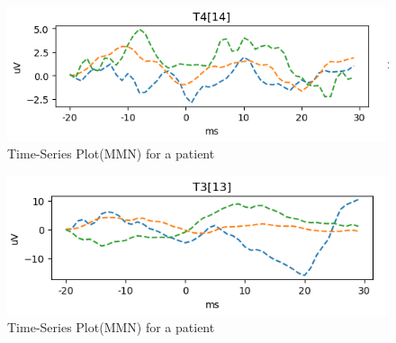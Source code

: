 \documentclass[10pt]{article}
\begin{document}
\begin{figure}
  \includegraphics{simiat_temporal.png}
  \caption{Time-Series Plot(MMN) for a patient} 
  \label{fig:MMN time-series plota}
\end{figure}

\begin{figure}
  \includegraphics{simiat_temporal1.png}
  \caption{Time-Series Plot(MMN) for a patient} 
  \label{fig:MMN time-series plot}
\end{figure}

\clearpage
\end{document}
